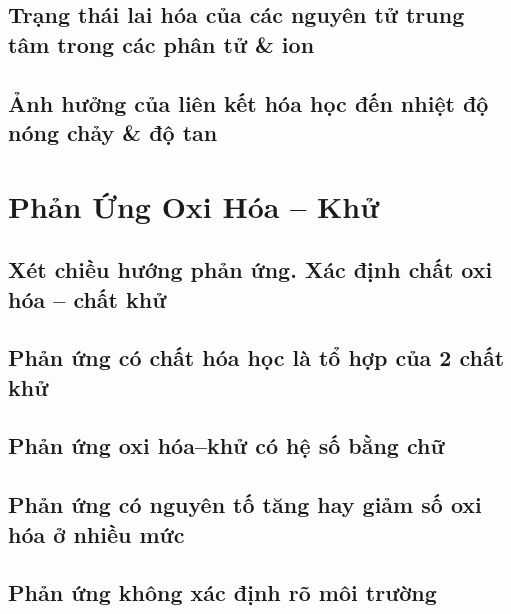 \documentclass{article}
\numberwithin{equation}{section}
\begin{document}
\subsection{Trạng thái lai hóa của các nguyên tử trung tâm trong các phân tử \& ion}


\subsection{Ảnh hưởng của liên kết hóa học đến nhiệt độ nóng chảy \& độ tan}


\section{Phản Ứng Oxi Hóa -- Khử}

\subsection{Xét chiều hướng phản ứng. Xác định chất oxi hóa -- chất khử}


\subsection{Phản ứng có chất hóa học là tổ hợp của 2 chất khử}


\subsection{Phản ứng oxi hóa--khử có hệ số bằng chữ}


\subsection{Phản ứng có nguyên tố tăng hay giảm số oxi hóa ở nhiều mức}


\subsection{Phản ứng không xác định rõ môi trường}
\end{document}
